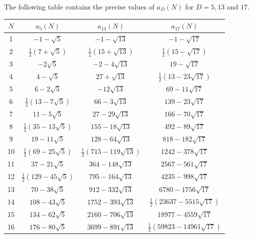 \documentclass[11pt]{amsart}
\numberwithin{equation}{section}
\theoremstyle{remark}
\begin{document}
The following table contains the precise values of $a_{D}(N)$ for $D = 5,13$ and $17$.

\begin{table}[ht]
\centering
\renewcommand{\arraystretch}{1.2} %
\begin{tabular}{|c|c|c|c|}
\hline
\textbf{\( N \)} 
& \textbf{$a_{5}(N)$} 
& \textbf{$a_{13}(N)$} 
& \textbf{$a_{17}(N)$} \\
\hline
1  & \( -1 - \sqrt{5} \) & \( -1 - \sqrt{13} \) & \( -1 - \sqrt{17} \) \\
\hline
2  & \( \frac{1}{2}(7 + \sqrt{5}) \) & \( \frac{1}{2}(15 + \sqrt{13}) \) & \( \frac{1}{2}(15 - \sqrt{17}) \) \\
\hline
3  & \( -2\sqrt{5} \) & \( -2 - 4\sqrt{13} \) & \( 19 - \sqrt{17} \) \\
\hline
4  & \( 4 - \sqrt{5} \) & \( 27 + \sqrt{13} \) & \( \frac{1}{2}(13 - 23\sqrt{17}) \) \\
\hline
5  & \( 6 - 2\sqrt{5} \) & \( -12\sqrt{13} \) & \( 69 - 11\sqrt{17} \) \\
\hline
6  & \( \frac{1}{2}(13 - 7\sqrt{5}) \) & \( 66 - 3\sqrt{13} \) & \( 139 - 23\sqrt{17} \) \\
\hline
7  & \( 11 - 5\sqrt{5} \) & \( 27 - 29\sqrt{13} \) & \( 166 - 70\sqrt{17} \) \\
\hline
8  & \( \frac{1}{2}(35 - 13\sqrt{5}) \) & \( 155 - 18\sqrt{13} \) & \( 492 - 89\sqrt{17} \) \\
\hline
9  & \( 19 - 11\sqrt{5} \) & \( 128 - 64\sqrt{13} \) & \( 818 - 182\sqrt{17} \) \\
\hline
10 & \( \frac{1}{2}(69 - 25\sqrt{5}) \) & \( \frac{1}{2}(715 - 119\sqrt{13}) \) & \( 1242 - 378\sqrt{17} \) \\
\hline
11 & \( 37 - 21\sqrt{5} \) & \( 364 - 148\sqrt{13} \) & \( 2567 - 561\sqrt{17} \) \\
\hline
12 & \( \frac{1}{2}(129 - 45\sqrt{5}) \) & \( 795 - 164\sqrt{13} \) & \( 4235 - 998\sqrt{17} \) \\
\hline
13 & \( 70 - 38\sqrt{5} \) & \( 912 - 332\sqrt{13} \) & \( 6780 - 1756\sqrt{17} \) \\
\hline
14 & \( 108 - 43\sqrt{5} \) & \( 1752 - 393\sqrt{13} \) & \( \frac{1}{2}(23637 - 5515\sqrt{17}) \) \\
\hline
15 & \( 134 - 62\sqrt{5} \) & \( 2160 - 706\sqrt{13} \) & \( 18977 - 4559\sqrt{17} \) \\
\hline
16 & \( 176 - 80\sqrt{5} \) & \( 3699 - 891\sqrt{13} \) & \( \frac{1}{2}(59823 - 14961\sqrt{17}) \) \\

\end{tabular}
\end{table}
\end{document}
